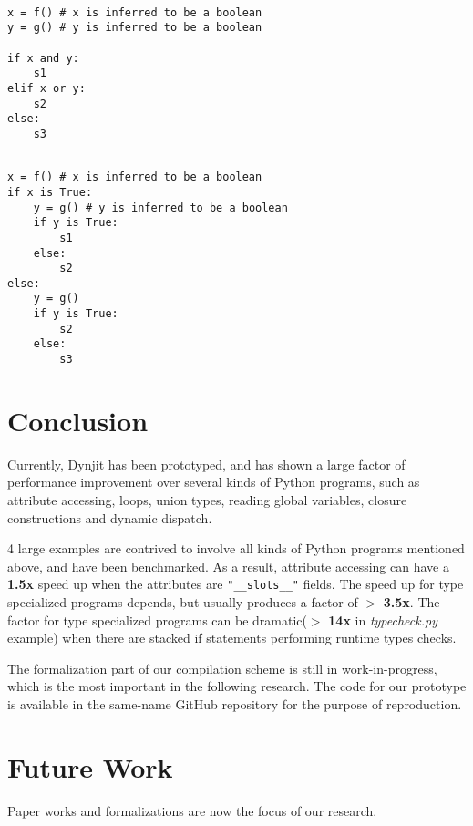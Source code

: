 \documentclass[conference]{IEEEtran}
\begin{document}
\lstset{language=Python, showlines=true, mathescape=true}
\begin{lstlisting}[caption=Boolean Split: Original Python Code]

x = f() # x is inferred to be a boolean
y = g() # y is inferred to be a boolean

if x and y:
    s1
elif x or y:
    s2
else:
    s3
\end{lstlisting}


\lstset{language=Python, showlines=true, mathescape=true}
\begin{lstlisting}[caption=Boolean Split: Boolean-split Python Code]

x = f() # x is inferred to be a boolean
if x is True:
    y = g() # y is inferred to be a boolean
    if y is True:
        s1
    else:
        s2
else:
    y = g()
    if y is True:
        s2
    else:
        s3
\end{lstlisting}


\section*{Conclusion}

Currently, Dynjit has been prototyped, and has shown a large factor of performance improvement over several kinds of Python programs, such as attribute accessing,
loops, union types, reading global variables, closure constructions and dynamic dispatch.

4 large examples are contrived to involve all kinds of Python programs mentioned above, and have been benchmarked. As a result, attribute accessing can have a \textbf{1.5x} speed up when the attributes are \lstinline!"__slots__"! fields.
The speed up for type specialized programs depends, but usually produces a factor of $>$ \textbf{3.5x}.
The factor for type specialized programs can be dramatic($>$ \textbf{14x} in \textit{typecheck.py} example)
when there are stacked if statements performing runtime types checks.

The formalization part of our compilation scheme is still in work-in-progress, which is the most important in the following research.
The code for our prototype is available in the same-name GitHub repository for the purpose of reproduction.

\section*{Future Work}

Paper works and formalizations are now the focus of our research.
\end{document}
